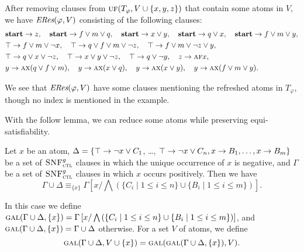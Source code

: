 \documentclass[twoside,11pt]{article}
\begin{document}
\begin{example}
    After removing clauses from $\textsc{uf}(T_\varphi, V\cup \{x,y,z\})$ that contain some atoms in $V$, we have $\emph{ERes}(\varphi,V)$
    consisting of the following clauses:
	\begin{align*}%
		&\start\rto z, \quad \start \rto f\vee m \vee q, \quad  \start \rto x \vee y, \quad \start \rto q \vee x, \quad	\start \rto f\vee m \vee y, \\
		& \top \rto f \vee m \vee \neg x, \quad		\top \rto q \vee f \vee m\vee \neg z,
            \quad  	\top \rto f \vee m \vee \neg z \vee y,\\
		& \top \rto q \vee x\vee \neg z, \quad 	\top \rto x \vee y \vee \neg z, \quad 	\top \rto q\vee\neg y , \quad z \rto \ALL \FUTURE x, \\
		& y \rto \ALL\NEXT(q \vee f\vee m), \quad  y \rto \ALL\NEXT(x\vee q), \quad y \rto \ALL \NEXT(x\vee y),\quad 	y \rto \ALL\NEXT(f\vee m\vee y).
	\end{align*}
	
    We see that  $\emph{ERes}(\varphi,V)$ have some clauses mentioning the refreshed atoms in $T_\varphi$, though
    no index is mentioned in the example.
\end{example}




With the follow lemma, we can reduce some atoms while preserving equi-satisfiability.

\begin{lemma} \label{thm:Aclm}
 Let $x$ be an atom, $\Delta = \{\top \rightarrow \neg x \vee C_1$, \dots, $\top \rightarrow \neg x \vee C_n, x \rightarrow B_1, \dots, x \rightarrow B_m\}$
 be a set of ${\textsc{SNF}_{\textsc{ctl}}^g}$ clauses in which the unique occurrence of $x$ is negative,
 and $\Gamma$ be a set of ${\textsc{SNF}_{\textsc{ctl}}^g}$ clauses in which $x$ occurs positively.
 Then we have
 \begin{equation}\label{eq:Ackermann:lemma}
    \Gamma\cup \Delta \equiv_{\{x\}}  
    \Gamma\left[x/\bigwedge\left(\{C_i\mid 1\le i\le n\}\cup\{B_i\mid 1\le i\le m\}\right)\right].
 \end{equation}
\end{lemma}
%
In this case we define $\textsc{gal}(\Gamma\cup\Delta,\{x\})=\Gamma\left[x/\bigwedge\left(\{C_i\mid 1\le i\le n\}\cup\{B_i\mid 1\le i\le m\}\right)\right]$,
and $\textsc{gal}(\Gamma\cup\Delta,\{x\})=\Gamma\cup\Delta$ otherwise. For a set $V$ of atoms, we define
$$\textsc{gal}(\Gamma\cup\Delta,V\cup\{x\})=\textsc{gal}(\textsc{gal}(\Gamma\cup\Delta,\{x\}),V).$$
 
\end{document}
